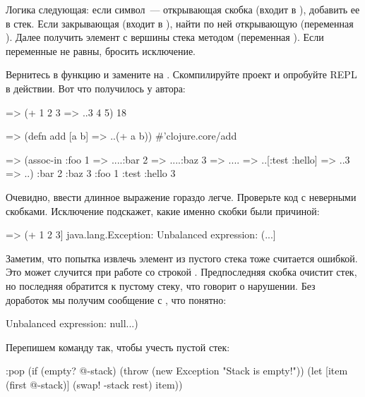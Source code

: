 Логика следующая: если символ~--- открывающая скобка (входит в ), добавить ее в стек. Если закрывающая (входит в ), найти по ней открывающую (переменная ). Далее получить элемент с вершины стека методом  (переменная ). Если переменные не равны, бросить исключение.

Вернитесь в функцию  и замените  на . Скомпилируйте проект и опробуйте REPL в действии. Вот что получилось у автора:

\begin{english}
  \begin{clojure}
=> (+ 1 2 3
=> ..3 4 5)
18

=> (defn add [a b]
=> ..(+ a b))
#'clojure.core/add

=> (assoc-in {:foo 1
=> ....:bar 2
=> ....:baz 3
=> ....}
=> ..[:test :hello]
=> ..3
=> ..)
{:bar 2 :baz 3 :foo 1 :test {:hello 3}}
  \end{clojure}
\end{english}

Очевидно, ввести длинное выражение гораздо легче. Проверьте код с неверными скобками. Исключение подскажет, какие именно скобки были причиной:

\begin{english}
  \begin{clojure}
=> (+ 1 2 3]
java.lang.Exception: Unbalanced expression: (...]
  \end{clojure}
\end{english}

Заметим, что попытка извлечь элемент из пустого стека тоже считается ошибкой. Это может случится при работе со строкой . Предпоследняя скобка очистит стек, но последняя обратится к пустому стеку, что говорит о нарушении. Без доработок мы получим сообщение с , что понятно:

\begin{english}
  \begin{clojure}
Unbalanced expression: null...)
  \end{clojure}
\end{english}

Перепишем команду  так, чтобы учесть пустой стек:

\begin{english}
  \begin{clojure}
:pop (if (empty? @-stack)
       (throw (new Exception "Stack is empty!"))
       (let [item (first @-stack)]
         (swap! -stack rest)
         item))
  \end{clojure}
\end{english}

